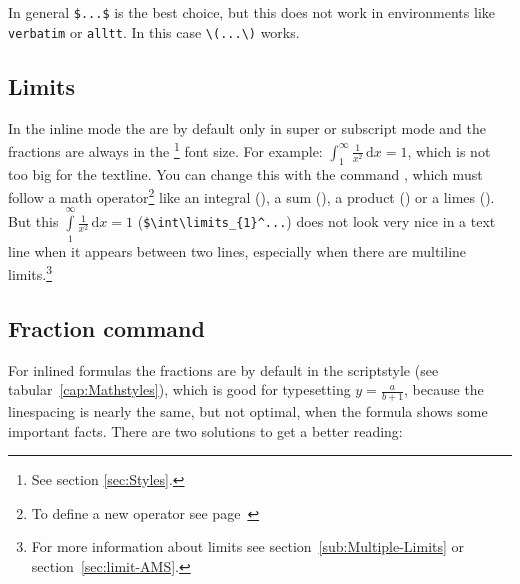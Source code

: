 In general \verb+$...$+ is the best choice, but this does not work in environments like \verb+verbatim+
or \verb+alltt+. In this case \verb+\(...\)+ works.


\subsection{Limits}\label{sub:Limits-Inline}

In the inline mode the  are by default only in
super or subscript mode and
the fractions are always in the %
\footnote{See section \vref{sec:Styles}.} 
font size. For
example: $\int_{1}^{\infty}\frac{1}{x^2}\,\mathrm{d}x=1$, which is not too
big for the textline. You %
can change this with the command ,
which must follow a math operator\footnote{To define a new operator see
page~\pageref{OperatorNames}} like %
 an integral (), a sum (),
a product () or a limes
(). But this $\int\limits_{1}^{\infty}\frac{1}{x^2}\,\mathrm{d}x=1$ 
(\lstinline|$\int\limits_{1}^...|) %
does not look very nice in a text line when it appears between two lines,
especially when there are multiline limits.\footnote{For more
information about limits see section~\vref{sub:Multiple-Limits} or section~\vref{sec:limit-AMS}.}


\subsection{Fraction command}\label{sub:fraction command}

For inlined formulas the fractions are by default
in the scriptstyle (see tabular~\vref{cap:Mathstyles}),
which is good for typesetting $y=\frac{a}{b+1}$, because the
linespacing %
is nearly the same, but not optimal, when the formula shows some important
facts. There are two solutions to get a better reading:

